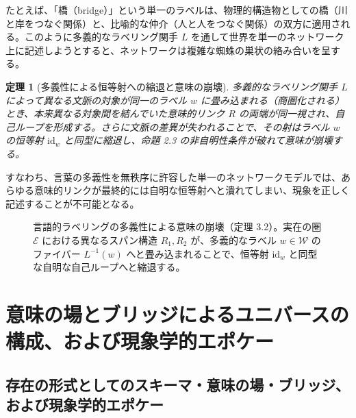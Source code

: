 \documentclass[11pt,a4paper,luatex]{jlreq}
\theoremstyle{definition}
\theoremstyle{plain}
\newtheorem{theorem}[definition]{定理}
\begin{document}
たとえば、「橋（bridge）」という単一のラベルは、物理的構造物としての橋（川と岸をつなぐ関係）と、比喩的な仲介（人と人をつなぐ関係）の双方に適用される。このように多義的なラベリング関手 $L$ を通して世界を単一のネットワーク上に記述しようとすると、ネットワークは複雑な蜘蛛の巣状の絡み合いを呈する。

\begin{theorem}[多義性による恒等射への縮退と意味の崩壊]
多義的なラベリング関手 $L$ によって異なる文脈の対象が同一のラベル $w$ に畳み込まれる（商圏化される）とき、本来異なる対象間を結んでいた意味的リンク $R$ の両端が同一視され、自己ループを形成する。さらに文脈の差異が失われることで、その射はラベル $w$ の恒等射 $\mathrm{id}_{w}$ と同型に縮退し、命題 2.3 の非自明性条件が破れて意味が崩壊する。
\end{theorem}

すなわち、言葉の多義性を無秩序に許容した単一のネットワークモデルでは、あらゆる意味的リンクが最終的には自明な恒等射へと潰れてしまい、現象を正しく記述することが不可能となる。

\begin{figure}[htbp]
\centering
{}
\caption{言語的ラベリングの多義性による意味の崩壊（定理 3.2）。実在の圏 $\mathcal{E}$ における異なるスパン構造 $R_1, R_2$ が、多義的なラベル $w \in \mathcal{W}$ のファイバー $L^{-1}(w)$ へと畳み込まれることで、恒等射 $\mathrm{id}_w$ と同型な自明な自己ループへと縮退する。}
\label{fig:polysemy_collapse}
\end{figure}


\section{意味の場とブリッジによるユニバースの構成、および現象学的エポケー}

\subsection{存在の形式としてのスキーマ・意味の場・ブリッジ、および現象学的エポケー}
\end{document}
